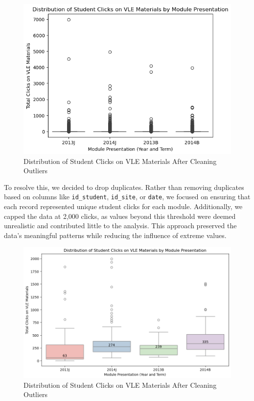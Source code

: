 \begin{figure}[h]
    \centering
    \includegraphics[width=\linewidth]{photo/barplot.PNG}
    \caption{Distribution of Student Clicks on VLE Materials After Cleaning Outliers}
    \label{barplot}
\end{figure}


To resolve this, we decided to drop duplicates. Rather than removing duplicates based on columns like \texttt{id\_student}, \texttt{id\_site}, or \texttt{date}, we focused on ensuring that each record represented unique student clicks for each module. Additionally, we capped the data at 2,000 clicks, as values beyond this threshold were deemed unrealistic and contributed little to the analysis. This approach preserved the data's meaningful patterns while reducing the influence of extreme values.

\begin{figure}[h]
    \centering
    \includegraphics[width=\linewidth]{photo/barplotcleaned.PNG}
    \caption{Distribution of Student Clicks on VLE Materials After Cleaning Outliers}
    \label{fig:barplotcleaned}
\end{figure}

